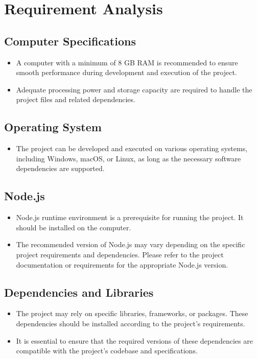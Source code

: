 \documentclass[a4paper,11pt]{report}
\begin{document}
\chapter{Requirement Analysis}
\section{Computer Specifications}
\begin{itemize}
  \item A computer with a minimum of 8 GB RAM is recommended to ensure smooth performance during development and execution of the project.
  \item Adequate processing power and storage capacity are required to handle the project files and related dependencies.
\end{itemize}

\section{Operating System}
\begin{itemize}
  \item The project can be developed and executed on various operating systems, including Windows, macOS, or Linux, as long as the necessary software dependencies are supported.
\end{itemize}

\section{Node.js}
\begin{itemize}
  \item Node.js runtime environment is a prerequisite for running the project. It should be installed on the computer.
  \item The recommended version of Node.js may vary depending on the specific project requirements and dependencies. Please refer to the project documentation or requirements for the appropriate Node.js version.
\end{itemize}

\section{Dependencies and Libraries}
\begin{itemize}
  \item The project may rely on specific libraries, frameworks, or packages. These dependencies should be installed according to the project's requirements.
  \item It is essential to ensure that the required versions of these dependencies are compatible with the project's codebase and specifications.
\end{itemize}
\end{document}
